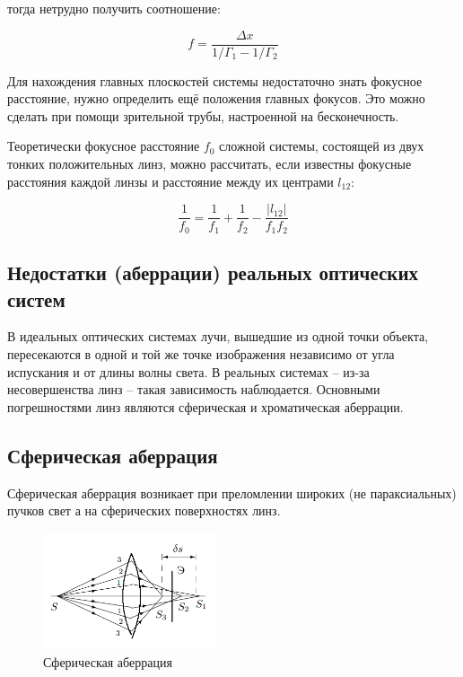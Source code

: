 	тогда нетрудно получить соотношение:
	
	\begin{equation} \label{eq:thik_lense_focus}
		f = \frac{\Delta x}{1 / \Gamma_1 - 1 / \Gamma_2}
	\end{equation}
	
	Для нахождения главных плоскостей системы недостаточно знать фокусное расстояние, нужно определить ещё положения главных фокусов. Это можно сделать при помощи зрительной трубы, настроенной на бесконечность.
	
	Теоретически фокусное расстояние $f_0$ сложной системы, состоящей из двух тонких положительных линз, можно рассчитать, если известны фокусные расстояния каждой линзы и расстояние между их центрами $l_{12}$:
	
	\begin{equation} \label{eq:theoretical_thik_lense_focus}
		\frac{1}{f_0} = \frac{1}{f_1} + \frac{1}{f_2} - \frac{|l_{12}|}{f_1 f_2}
	\end{equation}
	
	\subsection*{Недостатки (аберрации) реальных оптических систем}
	
	В идеальных оптических системах лучи, вышедшие из одной точки объекта, пересекаются в одной и той же точке изображения независимо от угла испускания и от длины волны света. В реальных системах -- из-за несовершенства линз -- такая зависимость наблюдается. Основными погрешностями линз являются сферическая и хроматическая аберрации.
	
	\subsection*{Сферическая аберрация}
	
	Сферическая аберрация возникает при преломлении широких (не параксиальных) пучков свет а на сферических поверхностях линз.
	
	\begin{figure}
		\includegraphics[width = 0.45\textwidth]{images/spherical_aberration.png}
		\caption{Сферическая аберрация}
		\label{fig:spherical_aberration}
	\end{figure}

